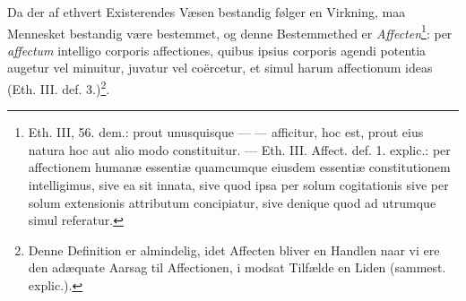 \documentclass[12pt,a4paper]{book}
\begin{document}
Da der af ethvert Existerendes Væsen bestandig følger
en Virkning, maa Mennesket bestandig være bestemmet, og
denne Bestemmethed er \emph{Affecten}\footnote{Eth. III, 56. dem.:
prout unusquisque --- --- afficitur, hoc est, prout eius natura
hoc aut alio modo constituitur. --- Eth. III. Affect. def. 1.
explic.: per affectionem humanæ essentiæ quamcumque
eiusdem essentiæ constitutionem intelligimus, sive ea sit
innata, sive quod ipsa per solum cogitationis sive per solum
extensionis attributum concipiatur, sive denique quod ad
utrumque simul referatur.}: per \emph{affectum} intelligo corporis
affectiones, quibus ipsius corporis agendi potentia augetur
vel minuitur, juvatur vel coërcetur, et simul harum
affectionum ideas (Eth. III. def.
3.)\footnote{Denne Definition er almindelig, idet Affecten
bliver en Handlen naar vi ere den adæquate Aarsag til
Affectionen, i modsat Tilfælde en Liden (sammest. explic.).}.
\end{document}

